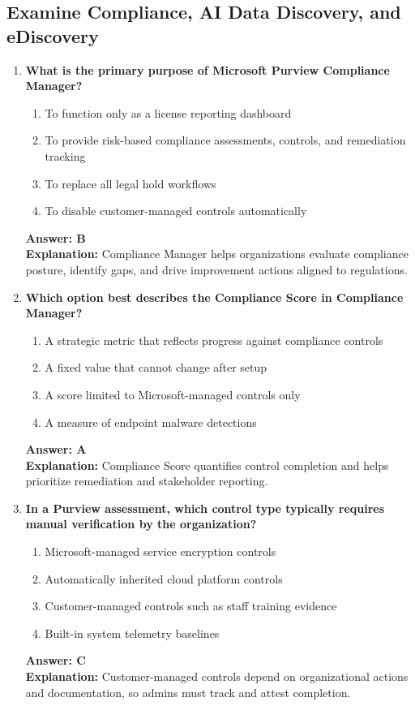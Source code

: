 \documentclass[10pt]{article}
\begin{document}
\clearpage
\subsection{Examine Compliance, AI Data Discovery, and eDiscovery}
\begin{enumerate}[leftmargin=*]

\item \textbf{What is the primary purpose of Microsoft Purview Compliance Manager?}
\begin{enumerate}[label=\Alph*.]
  \item To function only as a license reporting dashboard
  \item To provide risk-based compliance assessments, controls, and remediation tracking
  \item To replace all legal hold workflows
  \item To disable customer-managed controls automatically
\end{enumerate}
\textbf{Answer: B}\\
\textbf{Explanation:} Compliance Manager helps organizations evaluate compliance posture, identify gaps, and drive improvement actions aligned to regulations.

\item \textbf{Which option best describes the Compliance Score in Compliance Manager?}
\begin{enumerate}[label=\Alph*.]
  \item A strategic metric that reflects progress against compliance controls
  \item A fixed value that cannot change after setup
  \item A score limited to Microsoft-managed controls only
  \item A measure of endpoint malware detections
\end{enumerate}
\textbf{Answer: A}\\
\textbf{Explanation:} Compliance Score quantifies control completion and helps prioritize remediation and stakeholder reporting.

\item \textbf{In a Purview assessment, which control type typically requires manual verification by the organization?}
\begin{enumerate}[label=\Alph*.]
  \item Microsoft-managed service encryption controls
  \item Automatically inherited cloud platform controls
  \item Customer-managed controls such as staff training evidence
  \item Built-in system telemetry baselines
\end{enumerate}
\textbf{Answer: C}\\
\textbf{Explanation:} Customer-managed controls depend on organizational actions and documentation, so admins must track and attest completion.


\end{enumerate}
\end{document}
